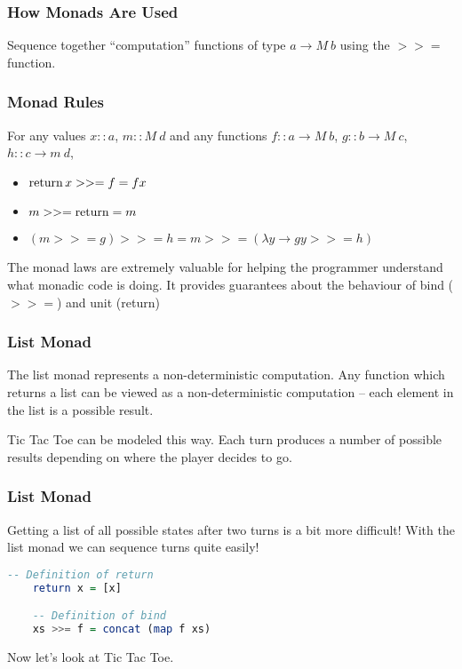 \documentclass[presentation.tex]{subfiles}
\begin{document}
\begin{frame}
  \frametitle{How Monads Are Used}

  Sequence together ``computation'' functions of type $a \rightarrow
  M\ b$ using the $>>=$ function.
\end{frame}

\begin{frame}
  \frametitle{Monad Rules}
  For any values $x::a$, $m::M\ d$ and any functions $f::a \rightarrow M\ b$, $g::b \rightarrow M\ c$, $h::c \rightarrow m\ d$,
  \begin{itemize}
  \item
    $\operatorname{return} x >>= f = f x$
  \item
    $m >>= \operatorname{return} = m$
  \item
    $(m >>= g) >>= h = m >>= (\lambda y \rightarrow g y >>= h)$
  \end{itemize}

  The monad laws are extremely valuable for helping the programmer
  understand what monadic code is doing. It provides guarantees about
  the behaviour of bind ($>>=$) and unit (return)
\end{frame}


\begin{frame}
  \frametitle{List Monad}

  The list monad represents a non-deterministic computation. Any
  function which returns a list can be viewed as a non-deterministic
  computation -- each element in the list is a possible result.

  Tic Tac Toe can be modeled this way. Each turn produces a number of
  possible results depending on where the player decides to go.
\end{frame}

\begin{frame}[fragile]
  \frametitle{List Monad}

  Getting a list of all possible states after two turns is a bit more
  difficult! With the list monad we can sequence turns quite easily!

  \begin{lstlisting}[frame=single,language=Haskell,breaklines=true]
    -- Definition of return
    return x = [x]

    -- Definition of bind
    xs >>= f = concat (map f xs)
  \end{lstlisting}

  Now let's look at Tic Tac Toe.
\end{frame}
\end{document}
